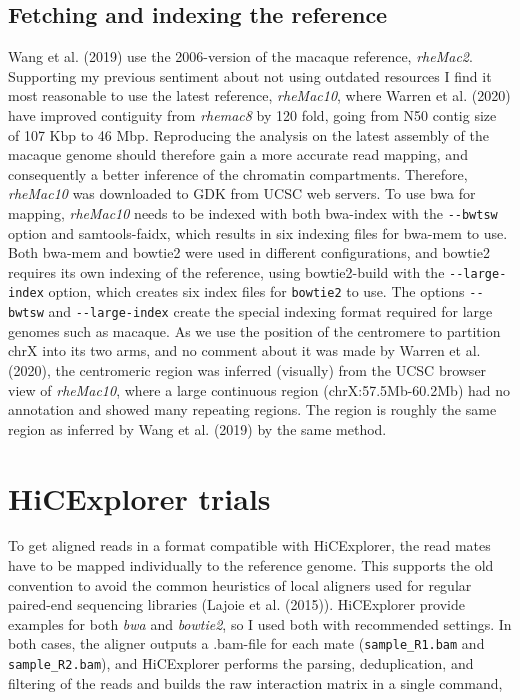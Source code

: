 \documentclass[
  11pt,
  a4paper,
]{scrbook}
\begin{document}
\subsection{Fetching and indexing the
reference}\label{fetching-and-indexing-the-reference}

Wang et al. (2019) use the 2006-version of the macaque reference,
\emph{rheMac2}. Supporting my previous sentiment about not using
outdated resources I find it most reasonable to use the latest
reference, \emph{rheMac10}, where Warren et al. (2020) have improved
contiguity from \emph{rhemac8} by 120 fold, going from N50 contig size
of 107 Kbp to 46 Mbp. Reproducing the analysis on the latest assembly of
the macaque genome should therefore gain a more accurate read mapping,
and consequently a better inference of the chromatin compartments.
Therefore, \emph{rheMac10} was downloaded to GDK from UCSC web servers.
To use bwa for mapping, \emph{rheMac10} needs to be indexed with both
bwa-index with the \texttt{-\/-bwtsw} option and samtools-faidx, which
results in six indexing files for bwa-mem to use. Both bwa-mem and
bowtie2 were used in different configurations, and bowtie2 requires its
own indexing of the reference, using bowtie2-build with the
\texttt{-\/-large-index} option, which creates six index files for
\texttt{bowtie2} to use. The options \texttt{-\/-bwtsw} and
\texttt{-\/-large-index} create the special indexing format required for
large genomes such as macaque. As we use the position of the centromere
to partition chrX into its two arms, and no comment about it was made by
Warren et al. (2020), the centromeric region was inferred (visually)
from the UCSC browser view of \emph{rheMac10}, where a large continuous
region (chrX:57.5Mb-60.2Mb) had no annotation and showed many repeating
regions. The region is roughly the same region as inferred by Wang et
al. (2019) by the same method.

\section{HiCExplorer trials}\label{hicexplorer-trials}

To get aligned reads in a format compatible with HiCExplorer, the read
mates have to be mapped individually to the reference genome. This
supports the old convention to avoid the common heuristics of local
aligners used for regular paired-end sequencing libraries (Lajoie et al.
(2015)). HiCExplorer provide examples for both \emph{bwa} and
\emph{bowtie2}, so I used both with recommended settings. In both cases,
the aligner outputs a .bam-file for each mate (\texttt{sample\_R1.bam}
and \texttt{sample\_R2.bam}), and HiCExplorer performs the parsing,
deduplication, and filtering of the reads and builds the raw interaction
matrix in a single command,
\end{document}
